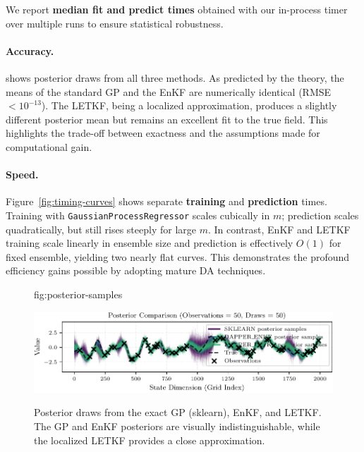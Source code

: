 \documentclass[wcp]{jmlr} %
\begin{document}
We report \textbf{median fit and predict times} obtained with our in-process timer over multiple runs to ensure statistical robustness.

\paragraph{Accuracy.}
 shows posterior draws from all three methods. As predicted by the theory, the means of the standard GP and the EnKF are numerically identical (RMSE $<10^{-13}$). The LETKF, being a localized approximation, produces a slightly different posterior mean but remains an excellent fit to the true field. This highlights the trade-off between exactness and the assumptions made for computational gain.

\paragraph{Speed.}
Figure~\ref{fig:timing-curves} shows separate \textbf{training} and \textbf{prediction} times. Training with \texttt{GaussianProcessRegressor} scales cubically in $m$; prediction scales quadratically, but still rises steeply for large $m$. In contrast, EnKF and LETKF training scale linearly in ensemble size and prediction is effectively $O(1)$ for fixed ensemble, yielding two nearly flat curves. This demonstrates the profound efficiency gains possible by adopting mature DA techniques.

\begin{figure}[htbp]
  \floatconts
    {fig:posterior-samples} %
    {\caption{Posterior draws from the exact GP (sklearn), EnKF, and LETKF. The GP and EnKF posteriors are visually indistinguishable, while the localized LETKF provides a close approximation.}} %
    {\centering\includegraphics[width=\linewidth]{posterior_samples.pdf}}
\end{figure}
\end{document}

